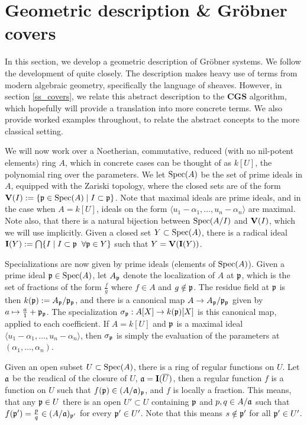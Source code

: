 \section{Geometric description \& Gröbner covers} \label{sec:grb_covers}
In this section, we develop a geometric description of Gröbner systems. We follow the development of \cite{grb_covers} quite closely. The description makes heavy use of terms from modern algebraic geometry, specifically the language of sheaves. However, in section \ref{ss_covers}, we relate this abstract description to the $\mathbf{CGS}$ algorithm, which hopefully will provide a translation into more concrete terms. We also provide worked examples throughout, to relate the abstract concepts to the more classical setting.

We will now work over a Noetherian, commutative, reduced (with no nil-potent elements) ring $A$, which in concrete cases can be thought of as $k[U]$, the polynomial ring over the parameters. We let $\operatorname{Spec}(A)$ be the set of prime ideals in $A$, equipped with the Zariski topology, where the closed sets are of the form $\operatorname{\mathbf V}(I) := \{\mathfrak p \in \operatorname{Spec}(A) \mid I \subset \mathfrak p\}$. Note that maximal ideals are prime ideals, and in the case when $A = k[U]$, ideals on the form $\langle u_{1} - \alpha_{1}, \dots, u_{n} - \alpha_{n} \rangle$ are maximal. Note also, that there is a natural bijection between $\operatorname{Spec}(A/I)$ and $\operatorname{\mathbf V}(I)$, which we will use implicitly. Given a closed set $Y \subset \operatorname{Spec}(A)$, there is a radical ideal $\operatorname{\mathbf I}(Y) := \bigcap\{I \mid I \subset \mathfrak p \;\; \forall \mathfrak p \in Y\}$ such that $Y = \operatorname{\mathbf V}(\operatorname{\mathbf I}(Y))$.

Specializations are now given by prime ideals (elements of $\operatorname{Spec}(A)$). Given a prime ideal $\mathfrak p \in \operatorname{Spec}(A)$, let $A_{\mathfrak p}$ denote the localization of $A$ at $\mathfrak p$, which is the set of fractions of the form $\frac{f}{g}$ where $f \in A$ and $g \notin \mathfrak p$. The residue field at $\mathfrak p$ is then $k(\mathfrak p) := A_{\mathfrak p}/\mathfrak p_{\mathfrak p}$, and there is a canonical map $A \to A_{\mathfrak p}/\mathfrak p_{\mathfrak p}$ given by $a \mapsto \frac a 1 + \mathfrak p_{\mathfrak p}$. The specialization $\sigma_{\mathfrak p} : A[X] \to k(\mathfrak p)[X]$ is this canonical map, applied to each coefficient. If $A = k[U]$ and $\mathfrak p$ is a maximal ideal $\langle u_{1} - \alpha_{1}, \dots, u_{n} - \alpha_{n} \rangle$, then $\sigma_{\mathfrak p}$ is simply the evaluation of the parameters at $(\alpha_{1}, \dots, \alpha_{n})$.

Given an open subset $U \subset \operatorname{Spec}(A)$, there is a ring of regular functions on $U$. Let $\mathfrak{a}$ be the readical of the closure of $U$, $\mathfrak{a} = \operatorname{\mathbf I}(\overline U)$, then a regular function $f$ is a function on $U$ such that $f(\mathfrak p) \in (A/\mathfrak{a})_{\mathfrak p}$, and $f$ is locally a fraction. This means, that any $\mathfrak p \in U$ there is an open $U' \subset U$ containing $\mathfrak p$ and $p, q \in A/\mathfrak{a}$ such that $f(\mathfrak p') = \frac p q \in (A/\mathfrak{a})_{\mathfrak p'}$ for every $\mathfrak p' \in U'$. Note that this means $s \notin \mathfrak p'$ for all $\mathfrak p' \in U'$.

